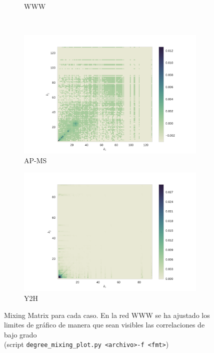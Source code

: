 \begin{figure}[!ht]
\begin{subfigure}[b]{0.45\columnwidth}
        \caption{\label{fig4:WWW}WWW}
    \end{subfigure}
    \\
    \begin{subfigure}[b]{0.45\columnwidth}
        \includegraphics[width=\textwidth]{./schemes/mixing_yeast_AP-MS-txt.pdf}
        \caption{\label{fig4:ap_ms} AP-MS}
    \end{subfigure}
    \begin{subfigure}[b]{0.45\columnwidth}
        \includegraphics[width=\textwidth]{./schemes/mixing_yeast_Y2H-txt.pdf}
        \caption{\label{fig4:y2h} Y2H}
    \end{subfigure}
    \caption{\label{fig4:mix} Mixing Matrix para cada caso. En la red WWW se ha ajustado los limites de gr\'afico
    de manera que sean visibles las correlaciones de bajo grado
    \\(script \texttt{degree\_mixing\_plot.py <archivo>\quad-f <fmt>})}
\end{figure}


